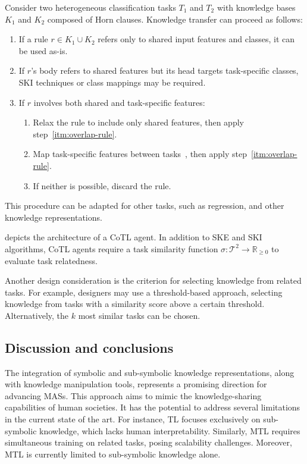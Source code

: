 Consider two heterogeneous classification tasks \(T_1\) and \(T_2\) with knowledge bases \(K_1\) and \(K_2\) composed of Horn clauses.
%
Knowledge transfer can proceed as follows:
%
\begin{enumerate}
    \item\label{itm:overlap-rule} If a rule \(r \in K_1 \cup K_2\) refers only to shared input features and classes, it can be used as-is.
    \item\label{itm:quasi-overlap-rule} If \(r\)'s body refers to shared features but its head targets task-specific classes, \gls{SKI} techniques or class mappings may be required.
    \item If \(r\) involves both shared and task-specific features:
    \begin{enumerate}
        \item Relax the rule to include only shared features, then apply step~\ref{itm:overlap-rule}.
        \item Map task-specific features between tasks~\cite{survey-heterogeneous-transfer-learning-day-2017}, then apply step~\ref{itm:overlap-rule}.
        \item If neither is possible, discard the rule.
    \end{enumerate}
\end{enumerate}
%
This procedure can be adapted for other tasks, such as regression, and other knowledge representations.

%
 depicts the architecture of a \gls{CoTL} agent.
%
In addition to \gls{SKE} and \gls{SKI} algorithms, \gls{CoTL} agents require a task similarity function \(\sigma : \mathcal{T}^2 \rightarrow \mathbb{R}_{\geq 0}\) to evaluate task relatedness.

Another design consideration is the criterion for selecting knowledge from related tasks.
%
For example, designers may use a threshold-based approach, selecting knowledge from tasks with a similarity score above a certain threshold.
%
Alternatively, the \(k\) most similar tasks can be chosen.


\subsection{Discussion and conclusions}
\label{subsec:discussion-conclusions}

The integration of symbolic and sub-symbolic knowledge representations, along with knowledge manipulation tools, represents a promising direction for advancing \glspl{MAS}.
%
This approach aims to mimic the knowledge-sharing capabilities of human societies.
%
It has the potential to address several limitations in the current state of the art.
%
For instance, \gls{TL} focuses exclusively on sub-symbolic knowledge, which lacks human interpretability.
%
Similarly, \gls{MTL} requires simultaneous training on related tasks, posing scalability challenges.
%
Moreover, \gls{MTL} is currently limited to sub-symbolic knowledge alone.
%

